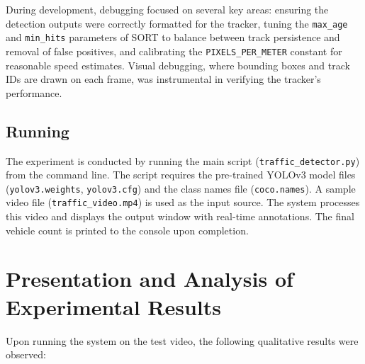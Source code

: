 \documentclass{article}
\begin{document}
During development, debugging focused on several key areas: ensuring the detection outputs were correctly formatted for the tracker, tuning the \texttt{max\_age} and \texttt{min\_hits} parameters of SORT to balance between track persistence and removal of false positives, and calibrating the \texttt{PIXELS\_PER\_METER} constant for reasonable speed estimates. Visual debugging, where bounding boxes and track IDs are drawn on each frame, was instrumental in verifying the tracker's performance.

\subsection{Running}

The experiment is conducted by running the main script (\texttt{traffic\_detector.py}) from the command line. The script requires the pre-trained YOLOv3 model files (\texttt{yolov3.weights}, \texttt{yolov3.cfg}) and the class names file (\texttt{coco.names}). A sample video file (\texttt{traffic\_video.mp4}) is used as the input source. The system processes this video and displays the output window with real-time annotations. The final vehicle count is printed to the console upon completion.

\section{Presentation and Analysis of Experimental Results}

Upon running the system on the test video, the following qualitative results were observed:
\end{document}
